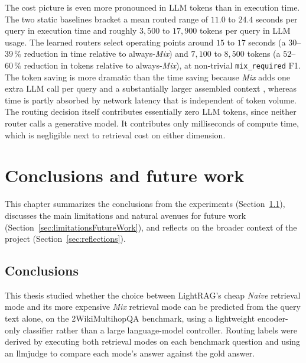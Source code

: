 \documentclass[english, bibtex]{kththesis}               %
\numberwithin{listing}{chapter}
\begin{document}
The cost picture is even more pronounced in LLM tokens than in execution time. The two static baselines bracket a mean routed range of $11.0$ to $24.4$ seconds per query in execution time and roughly $3{,}500$ to $17{,}900$ tokens per query in LLM usage. The learned routers select operating points around $15$ to $17$ seconds (a $30$--$39\,\%$ reduction in time relative to always-\emph{Mix}) and $7{,}100$ to $8{,}500$ tokens (a $52$--$60\,\%$ reduction in tokens relative to always-\emph{Mix}), at non-trivial \texttt{mix\_required} F1. The token saving is more dramatic than the time saving because \emph{Mix} adds one extra LLM call per query and a substantially larger assembled context \cite{lightrag2024,microsoft2024graphragcosts}, whereas time is partly absorbed by network latency that is independent of token volume. The routing decision itself contributes essentially zero LLM tokens, since neither router calls a generative model. It contributes only milliseconds of compute time, which is negligible next to retrieval cost on either dimension.

\cleardoublepage
\chapter{Conclusions and future work}
\label{ch:conclusionsAndFutureWork}

This chapter summarizes the conclusions from the experiments (Section~\ref{sec:conclusions}), discusses the main limitations and natural avenues for future work (Section~\ref{sec:limitationsFutureWork}), and reflects on the broader context of the project (Section~\ref{sec:reflections}).

\section{Conclusions}
\label{sec:conclusions}

This thesis studied whether the choice between LightRAG's cheap \emph{Naive} retrieval mode and its more expensive \emph{Mix} retrieval mode can be predicted from the query text alone, on the 2WikiMultihopQA benchmark, using a lightweight encoder-only classifier rather than a large language-model controller. Routing labels were derived by executing both retrieval modes on each benchmark question and using an \gls{llmjudge} \cite{zheng2023judge} to compare each mode's answer against the gold answer.
\end{document}
